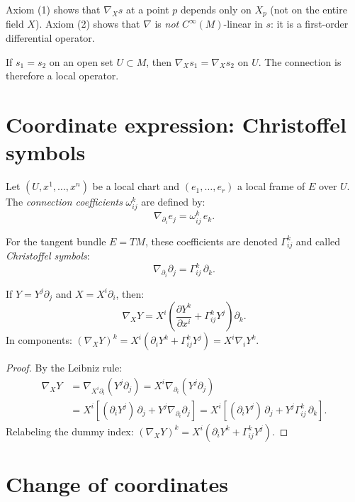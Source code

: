 \begin{remark}
Axiom (1) shows that $\nabla_X s$ at a point $p$ depends only on $X_p$
(not on the entire field $X$). Axiom (2) shows that $\nabla$ is \emph{not}
$C^\infty(M)$-linear in $s$: it is a first-order differential operator.
\end{remark}

\begin{proposition}[Locality]
If $s_1 = s_2$ on an open set $U \subset M$, then $\nabla_X s_1 = \nabla_X s_2$
on $U$. The connection is therefore a local operator.
\end{proposition}

\section{Coordinate expression: Christoffel symbols}

Let $(U, x^1, \ldots, x^n)$ be a local chart and $(e_1, \ldots, e_r)$ a local
frame of $E$ over $U$. The \emph{connection coefficients} $\omega^k_{ij}$ are
defined by:
\[
    \nabla_{\partial_i} e_j = \omega^k_{ij}\, e_k.
\]

For the tangent bundle $E = TM$, these coefficients are denoted $\Gamma^k_{ij}$
and called \emph{Christoffel symbols}:
\[
    \nabla_{\partial_i} \partial_j = \Gamma^k_{ij}\, \partial_k.
\]

\begin{proposition}
If $Y = Y^j \partial_j$ and $X = X^i \partial_i$, then:
\[
    \nabla_X Y = X^i \left(\frac{\partial Y^k}{\partial x^i} + \Gamma^k_{ij} Y^j\right) \partial_k.
\]
In components: $(\nabla_X Y)^k = X^i (\partial_i Y^k + \Gamma^k_{ij} Y^j)
= X^i \nabla_i Y^k$.
\end{proposition}

\begin{proof}
By the Leibniz rule:
\begin{align*}
    \nabla_X Y &= \nabla_{X^i \partial_i}(Y^j \partial_j)
    = X^i \nabla_{\partial_i}(Y^j \partial_j) \\
    &= X^i \left[(\partial_i Y^j)\, \partial_j + Y^j \nabla_{\partial_i}\partial_j\right]
    = X^i \left[(\partial_i Y^j)\, \partial_j + Y^j \Gamma^k_{ij}\, \partial_k\right].
\end{align*}
Relabeling the dummy index: $(\nabla_X Y)^k = X^i(\partial_i Y^k + \Gamma^k_{ij} Y^j)$.
\end{proof}

\section{Change of coordinates}

